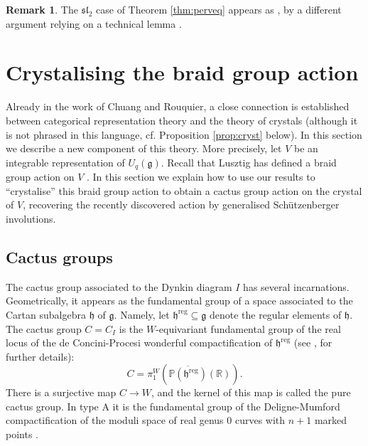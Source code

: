 \documentclass[11pt,reqno]{amsart}
\numberwithin{equation}{section}
\theoremstyle{definition}
\newtheorem{Remark}[equation]{Remark}
\theoremstyle{named}
\newcommand{\fg}{\mathfrak{g}}
\newcommand{\fh}{\mathfrak{h}}
\newcommand{\PP}{\mathbb{P}}
\newcommand{\RR}{\mathbb{R}}
\newcommand{\fsl}{\mathfrak{sl}}
\begin{document}
\begin{Remark}
The $\fsl_2$ case of Theorem \ref{thm:perveq} appears as \cite[Proposition 8.4]{CRperv}, by a different argument relying on a technical lemma \cite[Lemma 4.12]{CRperv}.  
\end{Remark}

 
\section{Crystalising the braid group action}\label{sec:cacti}

Already in the work of Chuang and Rouquier, a close connection is established between categorical representation theory and the theory of crystals (although it is not phrased in this language, cf. Proposition \ref{prop:cryst} below).  In this section we describe a new component of this theory.  More precisely, let $V$ be an integrable representation of $U_q(\fg)$.  Recall that Lusztig has defined a braid group action on $V$ \cite{Lusbook}.
In this section we explain how to use our results to ``crystalise'' this braid group action to obtain a cactus group action on the crystal of $V$, recovering the recently discovered action by generalised Sch\"utzenberger involutions. 

\subsection{Cactus groups}\label{sec:cactus}
The cactus group associated to the Dynkin diagram $I$ has several incarnations.  Geometrically, it appears  as the fundamental group of a  space associated to the Cartan subalgebra $\fh$ of $\fg$. Namely, let $\fh^{\text{reg}}\subseteq \fg$ denote the regular elements of $\fh$. The cactus group $C=C_I$ is the $W$-equivariant fundamental group of the real locus of the de Concini-Procesi wonderful compactification of $\fh^{\text{reg}}$ (see \cite{DJS03}, \cite[Section 2]{HKRW} for further details):
$$C=\pi^W_1(\overline{\PP(\fh^{\text{reg}})}(\RR)).$$
There is a surjective map $C \to W$, and the kernel of this map is called the pure cactus group.  In type A it is  the fundamental
group of the Deligne-Mumford compactification of the moduli space of real genus
$0$ curves with $n + 1$ marked points \cite{HK06}. 
\end{document}
